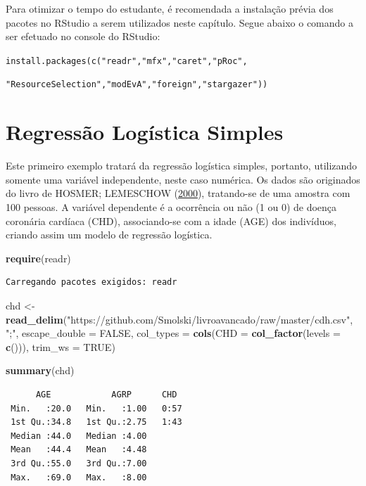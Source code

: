 \documentclass[12pt,brazil,oneside]{book}
\newenvironment{Shaded}{\begin{snugshade}}{\end{snugshade}}
\newcommand{\DataTypeTok}[1]{\textcolor[rgb]{0.13,0.29,0.53}{#1}}
\newcommand{\KeywordTok}[1]{\textcolor[rgb]{0.13,0.29,0.53}{\textbf{#1}}}
\newcommand{\NormalTok}[1]{#1}
\newcommand{\OtherTok}[1]{\textcolor[rgb]{0.56,0.35,0.01}{#1}}
\newcommand{\StringTok}[1]{\textcolor[rgb]{0.31,0.60,0.02}{#1}}
\begin{document}
Para otimizar o tempo do estudante, é recomendada a instalação prévia dos pacotes no RStudio a serem utilizados neste capítulo. Segue abaixo o comando a ser efetuado no console do RStudio:

\texttt{install.packages(c("readr","mfx","caret","pRoc",}

\texttt{"ResourceSelection","modEvA","foreign","stargazer"))}

\hypertarget{regressao-logistica-simples}{%
\section{Regressão Logística Simples}\label{regressao-logistica-simples}}

Este primeiro exemplo tratará da regressão logística simples, portanto, utilizando somente uma variável independente, neste caso numérica. Os dados são originados do livro de HOSMER; LEMESCHOW (\protect\hyperlink{ref-Hosmer2000}{2000}), tratando-se de uma amostra com 100 pessoas. A variável dependente é a ocorrência ou não (1 ou 0) de doença coronária cardíaca (CHD), associando-se com a idade (AGE) dos indivíduos, criando assim um modelo de regressão logística.

\begin{Shaded}
\begin{Highlighting}[]
\KeywordTok{require}\NormalTok{(readr)}
\end{Highlighting}
\end{Shaded}

\begin{verbatim}
Carregando pacotes exigidos: readr
\end{verbatim}

\begin{Shaded}
\begin{Highlighting}[]
\NormalTok{chd <-}\StringTok{ }\KeywordTok{read_delim}\NormalTok{(}\StringTok{"https://github.com/Smolski/livroavancado/raw/master/cdh.csv"}\NormalTok{, }
    \StringTok{";"}\NormalTok{, }\DataTypeTok{escape_double =} \OtherTok{FALSE}\NormalTok{, }\DataTypeTok{col_types =} \KeywordTok{cols}\NormalTok{(}\DataTypeTok{CHD =} \KeywordTok{col_factor}\NormalTok{(}\DataTypeTok{levels =} \KeywordTok{c}\NormalTok{())), }
    \DataTypeTok{trim_ws =} \OtherTok{TRUE}\NormalTok{)}

\KeywordTok{summary}\NormalTok{(chd)}
\end{Highlighting}
\end{Shaded}

\begin{verbatim}
      AGE            AGRP      CHD   
 Min.   :20.0   Min.   :1.00   0:57  
 1st Qu.:34.8   1st Qu.:2.75   1:43  
 Median :44.0   Median :4.00         
 Mean   :44.4   Mean   :4.48         
 3rd Qu.:55.0   3rd Qu.:7.00         
 Max.   :69.0   Max.   :8.00         
\end{verbatim}
\end{document}
